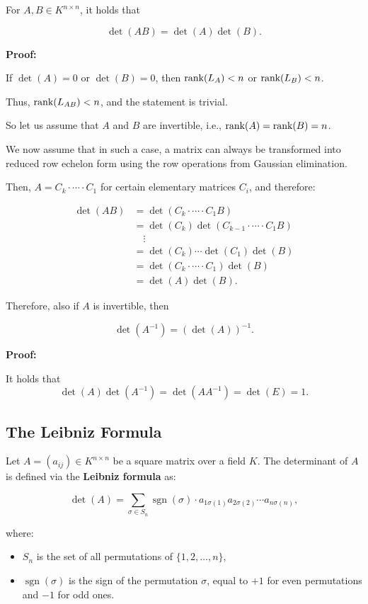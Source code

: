 For \( A, B \in K^{n \times n} \), it holds that

\[
    \det(AB) = \det(A)\det(B).
\]

\textbf{Proof:}

If \( \det(A) = 0 \) or \( \det(B) = 0 \), 
then \( \text{rank}(L_A) < n \) or \( \text{rank}(L_B) < n \).

Thus, \( \text{rank}(L_{AB}) < n \), 
and the statement is trivial.

So let us assume that \(A\) and \(B\) are 
invertible, i.e., \( \text{rank}(A) = \text{rank}(B) = n \).

We now assume that in such a case, a matrix can 
always be transformed into reduced row 
echelon form using the row operations 
from Gaussian elimination.

Then, \( A = C_k \cdot \cdots \cdot C_1 \) for certain elementary matrices \( C_i \), and therefore:

\begin{align*}
    \det(AB) &= \det(C_k \cdot \cdots \cdot C_1 B) \\
    &= \det(C_k)\det(C_{k-1} \cdot \cdots \cdot C_1 B) \\
    &\quad \vdots \\
    &= \det(C_k) \cdots \det(C_1)\det(B) \\
    &= \det(C_k \cdot \cdots \cdot C_1)\det(B) \\
    &= \det(A)\det(B).
\end{align*}

Therefore, also if \(A\) is invertible, then

\[
    \det(A^{-1}) = {(\det(A))}^{-1}.
\]

\textbf{Proof:} 

It holds that
\[
    \det(A)\det(A^{-1}) = \det(AA^{-1}) = \det(E) = 1.
\]

\subsection{The Leibniz Formula}

Let \( A = (a_{ij}) \in K^{n \times n} \) be a square matrix over a field \( K \). The determinant of \(A\) is defined via the \textbf{Leibniz formula} as:

\[
    \det(A) = \sum_{\sigma \in S_n} \operatorname{sgn}(\sigma) \cdot a_{1\sigma(1)} a_{2\sigma(2)} \cdots a_{n\sigma(n)},
\]

where:

\begin{itemize}

    \item \( S_n \) is the set of all permutations of \( \{1, 2, \dots, n\} \),

    \item \( \operatorname{sgn}(\sigma) \) is the sign of the permutation \( \sigma \), equal to \( +1 \) for even permutations and \( -1 \) for odd ones.

\end{itemize}

